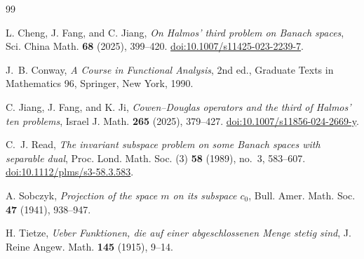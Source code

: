 \documentclass[11pt]{article}
\theoremstyle{remark}
\begin{document}
\begin{thebibliography}{99}

L. Cheng, J. Fang, and C. Jiang,
\emph{On Halmos' third problem on Banach spaces},
Sci. China Math. \textbf{68} (2025), 399--420.
\href{https://doi.org/10.1007/s11425-023-2239-7}
{doi:10.1007/s11425-023-2239-7}.

J.~B. Conway,
\emph{A Course in Functional Analysis}, 2nd ed.,
Graduate Texts in Mathematics 96, Springer, New York, 1990.

C. Jiang, J. Fang, and K. Ji,
\emph{Cowen--Douglas operators and the third of Halmos' ten problems},
Israel J. Math. \textbf{265} (2025), 379--427.
\href{https://doi.org/10.1007/s11856-024-2669-y}
{doi:10.1007/s11856-024-2669-y}.

C.~J. Read,
\emph{The invariant subspace problem on some Banach spaces with separable
 dual},
Proc. Lond. Math. Soc. (3) \textbf{58} (1989), no.~3, 583--607.
\href{https://doi.org/10.1112/plms/s3-58.3.583}
{doi:10.1112/plms/s3-58.3.583}.

A. Sobczyk,
\emph{Projection of the space $m$ on its subspace $c_0$},
Bull. Amer. Math. Soc. \textbf{47} (1941), 938--947.

H. Tietze,
\emph{Ueber Funktionen, die auf einer abgeschlossenen Menge stetig sind},
J. Reine Angew. Math. \textbf{145} (1915), 9--14.

\end{thebibliography}
\end{document}
